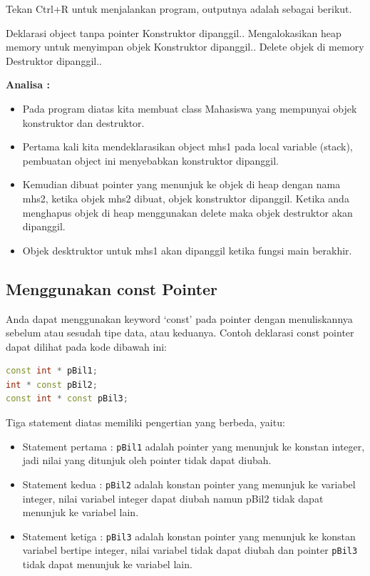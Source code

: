 Tekan Ctrl+R untuk menjalankan program, outputnya adalah sebagai
berikut.

\begin{lcverbatim}
Deklarasi object tanpa pointer
Konstruktor dipanggil..
Mengalokasikan heap memory untuk menyimpan objek
Konstruktor dipanggil..
Delete objek di memory
Destruktor dipanggil..
\end{lcverbatim}

\textbf{Analisa :}

\begin{itemize}

\item
  Pada program diatas kita membuat class Mahasiswa yang mempunyai objek
  konstruktor dan destruktor.
\item
  Pertama kali kita mendeklarasikan object mhs1 pada local variable
  (stack), pembuatan object ini menyebabkan konstruktor dipanggil.
\item
  Kemudian dibuat pointer yang menunjuk ke objek di heap dengan nama
  mhs2, ketika objek mhs2 dibuat, objek konstruktor dipanggil. Ketika
  anda menghapus objek di heap menggunakan delete maka objek destruktor
  akan dipanggil.
\item
  Objek desktruktor untuk mhs1 akan dipanggil ketika fungsi main
  berakhir.
\end{itemize}

\subsection{Menggunakan const Pointer}\label{menggunakan-const-pointer}

Anda dapat menggunakan keyword `const' pada pointer dengan menuliskannya
sebelum atau sesudah tipe data, atau keduanya. Contoh deklarasi const
pointer dapat dilihat pada kode dibawah ini:

\begin{lstlisting}[language=c++, numbers=none]
const int * pBil1;
int * const pBil2;
const int * const pBil3;
\end{lstlisting}

Tiga statement diatas memiliki pengertian yang berbeda, yaitu:

\begin{itemize}

\item
  Statement pertama : \texttt{pBil1} adalah pointer yang menunjuk ke
  konstan integer, jadi nilai yang ditunjuk oleh pointer tidak dapat
  diubah.
\item
  Statement kedua : \texttt{pBil2} adalah konstan pointer yang menunjuk
  ke variabel integer, nilai variabel integer dapat diubah namun pBil2
  tidak dapat menunjuk ke variabel lain.
\item
  Statement ketiga : \texttt{pBil3} adalah konstan pointer yang menunjuk
  ke konstan variabel bertipe integer, nilai variabel tidak dapat diubah
  dan pointer \texttt{pBil3} tidak dapat menunjuk ke variabel lain.
\end{itemize}

